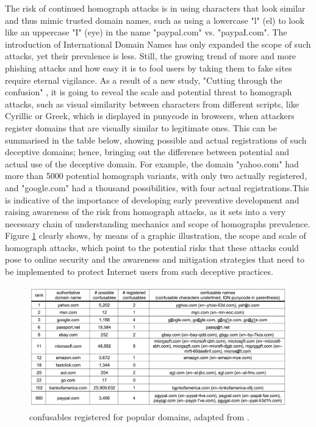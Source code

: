 The risk of continued homograph attacks is in using characters that look similar and thus mimic trusted domain names, such as using a lowercase "l" (el) to look like an uppercase "I" (eye) in the name "paypal.com" vs. "paypaI.com". The introduction of International Domain Names has only expanded the scope of such attacks, yet their prevalence is less. Still, the growing trend of more and more phishing attacks and how easy it is to fool users by taking them to fake sites require eternal vigilance. As a result of a new study, "Cutting through the confusion" \cite{holgers2006homograph}, it is going to reveal the scale and potential threat to homograph attacks, such as visual similarity between characters from different scripts, like Cyrillic or Greek, which is displayed in punycode in browsers, when attackers register domains that are visually similar to legitimate ones. This can be summarised in the table below, showing possible and actual registrations of such deceptive domains; hence, bringing out the difference between potential and actual use of the deceptive domain. For example, the domain "yahoo.com" had more than 5000 potential homograph variants, with only two actually registered, and "google.com" had a thousand possibilities, with four actual registrations.This is indicative of the importance of developing early preventive development and raising awareness of the risk from homograph attacks, as it sets into a very necessary chain of understanding mechanics and scope of homographs prevalence. Figure \ref{fig:figureAlot1} clearly shows, by means of a graphic illustration, the scope and scale of homograph attacks, which point to the potential risks that these attacks could pose to online security and the awareness and mitigation strategies that need to be implemented to protect Internet users from such deceptive practices. 

\captionsetup{font= footnotesize}
\begin{figure}[H]
    \centering
    \includegraphics[width=1\linewidth]{evaluation/confusable.png}
    
    \caption{confusables registered for popular domains, adapted from \cite{HomographAttacks}.}
    \label{fig:figureAlot1}
\end{figure}

